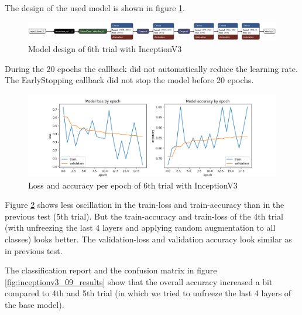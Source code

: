 \documentclass{article}
\begin{document}
The design of the used model is shown in figure \ref{fig:inceptionv3_09.keras_model_design}.
\begin{figure}%
    \centering
    \includegraphics[width=1.0\linewidth]{inceptionv3_09.keras_model_design_nice.png}
    \caption{Model design of 6th trial with InceptionV3}
    \label{fig:inceptionv3_09.keras_model_design}
\end{figure}

During the 20 epochs the callback did not automatically reduce the learning rate. The EarlyStopping callback did not stop the model before 20 epochs.\\

\begin{figure}%
    \centering
    \includegraphics[width=1.0\linewidth]{inceptionv3_09_loss_accuracy.png}
    \caption{Loss and accuracy per epoch of 6th trial with InceptionV3}
    \label{fig:inceptionv3_09_loss_accuracy}
\end{figure}
Figure \ref{fig:inceptionv3_09_loss_accuracy} shows less oscillation in the train-loss and train-accuracy than in the previous test (5th trial). But the train-accuracy and train-loss of the 4th trial (with unfreezing the last 4 layers and applying random augmentation to all classes) looks better. The validation-loss and validation accuracy look similar as in previous test. 

The classification report and the confusion matrix in figure \ref{fig:inceptionv3_09_results} show that the overall accuracy increased a bit compared to 4th and 5th trial (in which we tried to unfreeze the last 4 layers of the base model).\\ 
\end{document}
